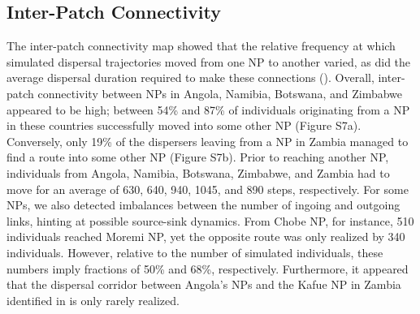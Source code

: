 \documentclass[abstract=on,10pt,a4paper,bibliography=totocnumbered]{article}
\begin{document}
\subsection{Inter-Patch Connectivity}
The inter-patch connectivity map showed that the relative frequency at which
simulated dispersal trajectories moved from one NP to another varied, as did the
average dispersal duration required to make these connections
(). Overall, inter-patch connectivity between NPs
in Angola, Namibia, Botswana, and Zimbabwe appeared to be high; between 54\% and
87\% of individuals originating from a NP in these countries successfully moved
into some other NP (Figure S7a). Conversely, only 19\% of the dispersers leaving
from a NP in Zambia managed to find a route into some other NP (Figure S7b).
Prior to reaching another NP, individuals from Angola, Namibia, Botswana,
Zimbabwe, and Zambia had to move for an average of 630, 640, 940, 1045, and 890
steps, respectively. For some NPs, we also detected imbalances between the
number of ingoing and outgoing links, hinting at possible source-sink dynamics.
From Chobe NP, for instance, 510 individuals reached Moremi NP, yet the opposite
route was only realized by 340 individuals. However, relative to the number of
simulated individuals, these numbers imply fractions of 50\% and 68\%,
respectively. Furthermore, it appeared that the dispersal corridor between
Angola's NPs and the Kafue NP in Zambia identified in
 is only rarely realized.
\end{document}
